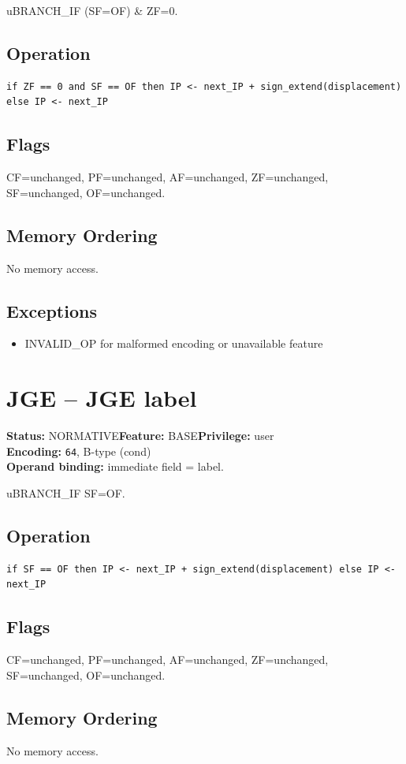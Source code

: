 \documentclass[10pt]{article}
\begin{document}
uBRANCH\_IF (SF=OF) \& ZF=0.

\subsection*{Operation}
\begin{lstlisting}
if ZF == 0 and SF == OF then IP <- next_IP + sign_extend(displacement) else IP <- next_IP
\end{lstlisting}
\subsection*{Flags}
CF=unchanged, PF=unchanged, AF=unchanged, ZF=unchanged, SF=unchanged, OF=unchanged.
\subsection*{Memory Ordering}
No memory access.
\subsection*{Exceptions}
\begin{itemize}
\item INVALID\_OP for malformed encoding or unavailable feature
\end{itemize}
\clearpage

\section{JGE -- JGE label}
\textbf{Status:} NORMATIVE\quad \textbf{Feature:} BASE\quad \textbf{Privilege:} user\\
\textbf{Encoding:} \texttt{64}, B-type (cond)\\
\textbf{Operand binding:} immediate field = label.

uBRANCH\_IF SF=OF.

\subsection*{Operation}
\begin{lstlisting}
if SF == OF then IP <- next_IP + sign_extend(displacement) else IP <- next_IP
\end{lstlisting}
\subsection*{Flags}
CF=unchanged, PF=unchanged, AF=unchanged, ZF=unchanged, SF=unchanged, OF=unchanged.
\subsection*{Memory Ordering}
No memory access.
\end{document}
